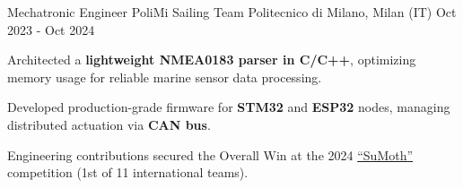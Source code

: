 
\cventry
{Mechatronic Engineer}
{PoliMi Sailing Team}
{Politecnico di Milano, Milan (IT)}
{Oct 2023 - Oct 2024}
{
    \begin{cvitems}
        \item {Architected a \textbf{lightweight NMEA0183 parser in C/C++}, optimizing memory usage for reliable marine sensor data processing.}
        \item {Developed production-grade firmware for \textbf{STM32} and \textbf{ESP32} nodes, managing distributed actuation via \textbf{CAN bus}.}
        \item {Engineering contributions secured the Overall Win at the 2024 \href{https://sumoth.org/}{``SuMoth''} competition (1st of 11 international teams).}
    \end{cvitems}
}